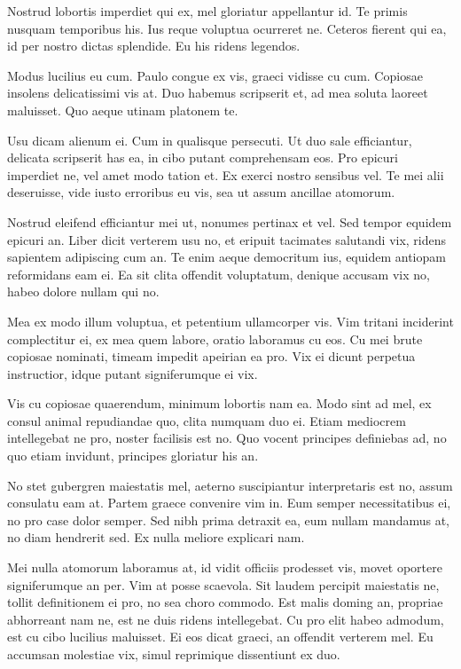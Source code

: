 \documentclass{adhsernotes}
\begin{document}
Nostrud lobortis imperdiet qui ex, mel gloriatur appellantur id. Te primis
nusquam temporibus his. Ius reque voluptua ocurreret ne. Ceteros fierent qui ea,
id per nostro dictas splendide. Eu his ridens legendos.

Modus lucilius eu cum. Paulo congue ex vis, graeci vidisse cu cum. Copiosae
insolens delicatissimi vis at. Duo habemus scripserit et, ad mea soluta laoreet
maluisset. Quo aeque utinam platonem te.

Usu dicam alienum ei. Cum in qualisque persecuti. Ut duo sale efficiantur,
delicata scripserit has ea, in cibo putant comprehensam eos. Pro epicuri
imperdiet ne, vel amet modo tation et. Ex exerci nostro sensibus vel. Te mei
alii deseruisse, vide iusto erroribus eu vis, sea ut assum ancillae atomorum.

Nostrud eleifend efficiantur mei ut, nonumes pertinax et vel. Sed tempor equidem
epicuri an. Liber dicit verterem usu no, et eripuit tacimates salutandi vix,
ridens sapientem adipiscing cum an. Te enim aeque democritum ius, equidem
antiopam reformidans eam ei. Ea sit clita offendit voluptatum, denique accusam
vix no, habeo dolore nullam qui no.

Mea ex modo illum voluptua, et petentium ullamcorper vis. Vim tritani inciderint
complectitur ei, ex mea quem labore, oratio laboramus cu eos. Cu mei brute
copiosae nominati, timeam impedit apeirian ea pro. Vix ei dicunt perpetua
instructior, idque putant signiferumque ei vix.

Vis cu copiosae quaerendum, minimum lobortis nam ea. Modo sint ad mel, ex consul
animal repudiandae quo, clita numquam duo ei. Etiam mediocrem intellegebat ne
pro, noster facilisis est no. Quo vocent principes definiebas ad, no quo etiam
invidunt, principes gloriatur his an.

No stet gubergren maiestatis mel, aeterno suscipiantur interpretaris est no,
assum consulatu eam at. Partem graece convenire vim in. Eum semper
necessitatibus ei, no pro case dolor semper. Sed nibh prima detraxit ea, eum
nullam mandamus at, no diam hendrerit sed. Ex nulla meliore explicari nam.

Mei nulla atomorum laboramus at, id vidit officiis prodesset vis, movet oportere
signiferumque an per. Vim at posse scaevola. Sit laudem percipit maiestatis ne,
tollit definitionem ei pro, no sea choro commodo. Est malis doming an, propriae
abhorreant nam ne, est ne duis ridens intellegebat. Cu pro elit habeo admodum,
est cu cibo lucilius maluisset. Ei eos dicat graeci, an offendit verterem
mel. Eu accumsan molestiae vix, simul reprimique dissentiunt ex duo.
\end{document}
